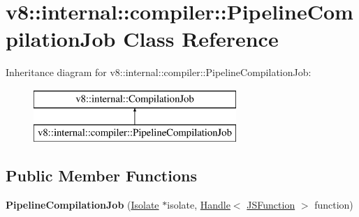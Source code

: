 \hypertarget{classv8_1_1internal_1_1compiler_1_1_pipeline_compilation_job}{}\section{v8\+:\+:internal\+:\+:compiler\+:\+:Pipeline\+Compilation\+Job Class Reference}
\label{classv8_1_1internal_1_1compiler_1_1_pipeline_compilation_job}
Inheritance diagram for v8\+:\+:internal\+:\+:compiler\+:\+:Pipeline\+Compilation\+Job\+:\begin{figure}[H]
\begin{center}
\leavevmode
\includegraphics[height=2.000000cm]{classv8_1_1internal_1_1compiler_1_1_pipeline_compilation_job}
\end{center}
\end{figure}
\subsection*{Public Member Functions}
\begin{DoxyCompactItemize}
\item 
{\bfseries Pipeline\+Compilation\+Job} (\hyperlink{classv8_1_1internal_1_1_isolate}{Isolate} $\ast$isolate, \hyperlink{classv8_1_1internal_1_1_handle}{Handle}$<$ \hyperlink{classv8_1_1internal_1_1_j_s_function}{J\+S\+Function} $>$ function)\hypertarget{classv8_1_1internal_1_1compiler_1_1_pipeline_compilation_job_ae40378c047a544e5868b4ae4ec3e1d5d}{}\label{classv8_1_1internal_1_1compiler_1_1_pipeline_compilation_job_ae40378c047a544e5868b4ae4ec3e1d5d}

\end{DoxyCompactItemize}
